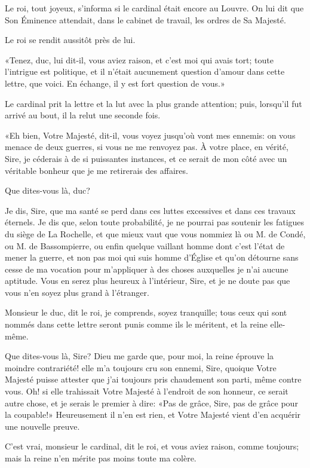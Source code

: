 Le roi, tout joyeux, s'informa si le cardinal était encore au Louvre. On lui dit que Son Éminence attendait, dans le cabinet de travail, les ordres de Sa Majesté. 

Le roi se rendit aussitôt près de lui. 

«Tenez, duc, lui dit-il, vous aviez raison, et c'est moi qui avais tort; toute l'intrigue est politique, et il n'était aucunement question d'amour dans cette lettre, que voici. En échange, il y est fort question de vous.» 

Le cardinal prit la lettre et la lut avec la plus grande attention; puis, lorsqu'il fut arrivé au bout, il la relut une seconde fois. 

«Eh bien, Votre Majesté, dit-il, vous voyez jusqu'où vont mes ennemis: on vous menace de deux guerres, si vous ne me renvoyez pas. À votre place, en vérité, Sire, je céderais à de si puissantes instances, et ce serait de mon côté avec un véritable bonheur que je me retirerais des affaires. 

\speak  Que dites-vous là, duc? 

\speak  Je dis, Sire, que ma santé se perd dans ces luttes excessives et dans ces travaux éternels. Je dis que, selon toute probabilité, je ne pourrai pas soutenir les fatigues du siège de La Rochelle, et que mieux vaut que vous nommiez là ou M. de Condé, ou M. de Bassompierre, ou enfin quelque vaillant homme dont c'est l'état de mener la guerre, et non pas moi qui suis homme d'Église et qu'on détourne sans cesse de ma vocation pour m'appliquer à des choses auxquelles je n'ai aucune aptitude. Vous en serez plus heureux à l'intérieur, Sire, et je ne doute pas que vous n'en soyez plus grand à l'étranger. 

\speak  Monsieur le duc, dit le roi, je comprends, soyez tranquille; tous ceux qui sont nommés dans cette lettre seront punis comme ils le méritent, et la reine elle-même. 

\speak  Que dites-vous là, Sire? Dieu me garde que, pour moi, la reine éprouve la moindre contrariété! elle m'a toujours cru son ennemi, Sire, quoique Votre Majesté puisse attester que j'ai toujours pris chaudement son parti, même contre vous. Oh! si elle trahissait Votre Majesté à l'endroit de son honneur, ce serait autre chose, et je serais le premier à dire: «Pas de grâce, Sire, pas de grâce pour la coupable!» Heureusement il n'en est rien, et Votre Majesté vient d'en acquérir une nouvelle preuve. 

\speak  C'est vrai, monsieur le cardinal, dit le roi, et vous aviez raison, comme toujours; mais la reine n'en mérite pas moins toute ma colère. 

